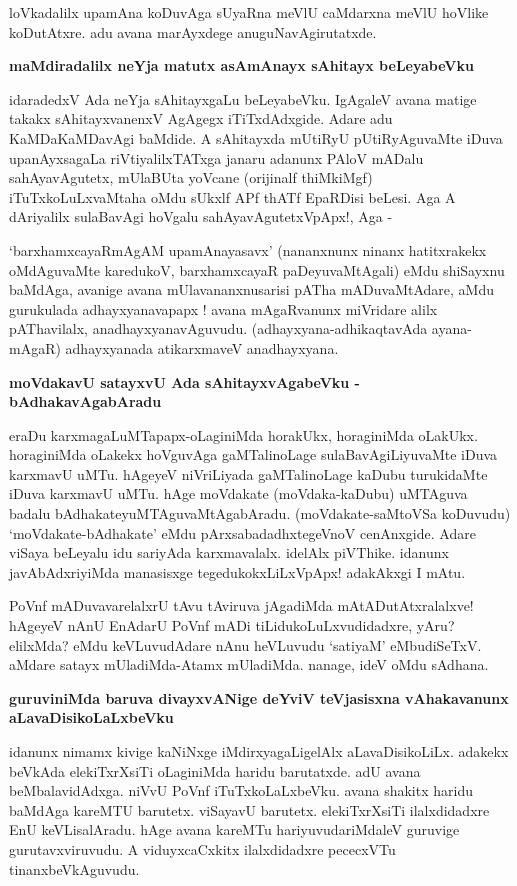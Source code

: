 loVkadalilx upamAna koDuvAga sUyaRna meVlU caMdarxna meVlU hoVlike koDutAtxre. adu avana marAyxdege anuguNavAgirutatxde.

\newpage

{\bigskip
\noindent
{\large\bf maMdiradalilx neYja matutx asAmAnayx sAhitayx beLeyabeVku}}
\medskip

\noindent
idaradedxV Ada neYja sAhitayxgaLu beLeyabeVku. IgAgaleV avana matige takakx sAhitayxvanenxV AgAgegx iTiTxdAdxgide. Adare adu KaMDaKaMDavAgi baMdide. A sAhitayxda mUtiRyU pUtiRyAguvaMte iDuva upanAyxsagaLa riVtiyalilxTATxga janaru adanunx PAloV mADalu sahAyavAgutetx, mUlaBUta yoVcane (orijinalf thiMkiMgf) iTuTxkoLuLxvaMtaha oMdu sUkxlf APf thATf EpaRDisi beLesi. Aga A dAriyalilx sulaBavAgi hoVgalu sahAyavAgutetxVpApx!, Aga - 

`barxhamxcayaRmAgAM\label{78} upamAnayasavx' (nananxnunx ninanx hatitxrakekx oMdAguvaMte karedukoV, barxhamxcayaR paDeyuvaMtAgali) eMdu shiSayxnu baMdAga, avanige avana mUlavananxnusarisi pATha mADuvaMtAdare, aMdu gurukulada adhayxyanavapapx ! avana mAgaRvanunx miVridare alilx pAThavilalx, anadhayxyanavAguvudu. (adhayxyana-adhikaqtavAda ayana-mAgaR) adhayxyanada atikarxmaveV anadhayxyana.

{\bigskip
\noindent
{\large\bf moVdakavU satayxvU Ada sAhitayxvAgabeVku - bAdhakavAgabAradu}}\label{page78}
\medskip

\noindent
eraDu karxmagaLuMTapapx-oLaginiMda horakUkx, horaginiMda oLakUkx. horaginiMda oLakekx hoVguvAga gaMTalinoLage sulaBavAgiLiyuvaMte iDuva karxmavU uMTu. hAgeyeV niVriLiyada gaMTalinoLage kaDubu turukidaMte iDuva karxmavU uMTu. hAge moVdakate (moVdaka-kaDubu) uMTAguva badalu bAdhakateyuMTAguvaMtAgabAradu. (moVdakate-saMtoVSa koDuvudu) `moVdakate-bAdhakate' eMdu pArxsabadadhxtegeVnoV cenAnxgide. Adare viSaya beLeyalu idu sariyAda karxmavalalx. idelAlx piVThike. idanunx javAbAdxriyiMda manasisxge tegedukokxLiLxVpApx! adakAkxgi I mAtu. 

PoVnf mADuvavarelalxrU tAvu tAviruva jAgadiMda mAtADutAtxralalxve! hAgeyeV nAnU EnAdarU PoVnf mADi tiLidukoLuLxvudidadxre, yAru? elilxMda? eMdu keVLuvudAdare nAnu heVLuvudu `satiyaM' eMbudiSeTxV. aMdare satayx mUladiMda-Atamx mUladiMda. nanage, ideV oMdu sAdhana.

{\bigskip
\noindent
{\large\bf guruviniMda baruva divayxvANige deYviV teVjasisxna vAhakavanunx aLavaDisikoLaLxbeVku}}\label{page79}
\medskip

\noindent
idanunx nimamx kivige kaNiNxge iMdirxyagaLigelAlx aLavaDisikoLiLx. adakekx beVkAda elekiTxrXsiTi oLaginiMda haridu barutatxde. adU avana beMbalavidAdxga. niVvU PoVnf iTuTxkoLaLxbeVku. avana shakitx haridu baMdAga kareMTU barutetx. viSayavU barutetx. elekiTxrXsiTi ilalxdidadxre EnU keVLisalAradu. hAge avana kareMTu hariyuvudariMdaleV guruvige gurutavxviruvudu. A viduyxcaCxkitx ilalxdidadxre pececxVTu tinanxbeVkAguvudu.

